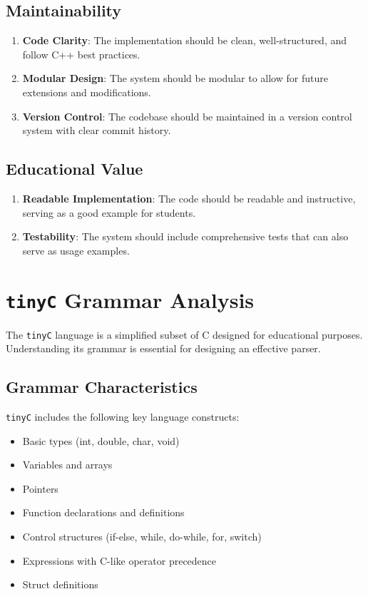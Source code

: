 \subsection{Maintainability}
\begin{enumerate}
    \item \textbf{Code Clarity}: The implementation should be clean, well-structured, and follow C++ best practices.
    \item \textbf{Modular Design}: The system should be modular to allow for future extensions and modifications.
    \item \textbf{Version Control}: The codebase should be maintained in a version control system with clear commit history.
\end{enumerate}

\subsection{Educational Value}
\begin{enumerate}
    \item \textbf{Readable Implementation}: The code should be readable and instructive, serving as a good example for students.
    \item \textbf{Testability}: The system should include comprehensive tests that can also serve as usage examples.
\end{enumerate}

\section{\texttt{tinyC} Grammar Analysis}

The \texttt{tinyC} language is a simplified subset of C designed for educational purposes. Understanding its grammar is essential for designing an effective parser.

\subsection{Grammar Characteristics}

\texttt{tinyC} includes the following key language constructs:
\begin{itemize}
    \item Basic types (int, double, char, void)
    \item Variables and arrays
    \item Pointers
    \item Function declarations and definitions
    \item Control structures (if-else, while, do-while, for, switch)
    \item Expressions with C-like operator precedence
    \item Struct definitions
\end{itemize}

